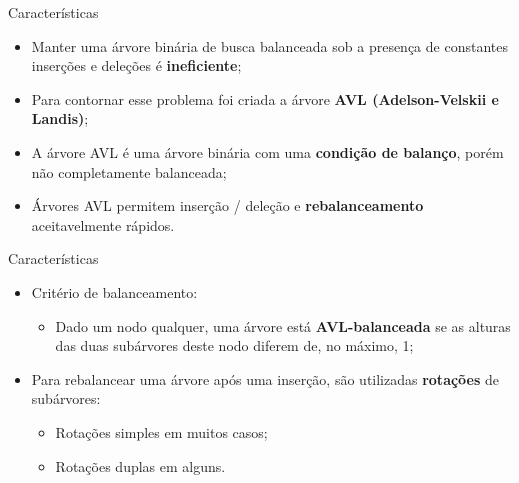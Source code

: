 \documentclass[12pt,table,xcolor={dvipsnames}]{beamer}
\begin{document}
\begin{frame}[fragile]{Características}
\begin{itemize}
\item Manter uma árvore binária de busca balanceada sob a presença de constantes inserções e deleções é \textbf{ineficiente};
\item Para contornar esse problema foi criada a árvore \textbf{AVL (Adelson-Velskii e Landis)};
\item A árvore AVL é uma árvore binária com uma \textbf{condição de balanço}, porém não completamente balanceada;
\item Árvores AVL permitem inserção / deleção e \textbf{rebalanceamento} aceitavelmente rápidos.
\end{itemize}
\end{frame}

\begin{frame}[fragile]{Características}
\begin{itemize}
\item Critério de balanceamento:
\begin{itemize}
\item Dado um nodo qualquer, uma árvore está \textbf{AVL-balanceada} se as alturas das duas subárvores deste nodo diferem de, no máximo, 1;
\end{itemize}
\item Para rebalancear uma árvore após uma inserção, são utilizadas \textbf{rotações} de subárvores:
\begin{itemize}
\item Rotações simples em muitos casos;
\item Rotações duplas em alguns.
\end{itemize}
\end{itemize}
\end{frame}
\end{document}
